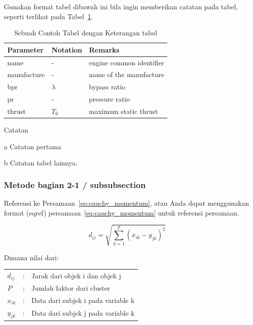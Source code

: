 \documentclass[
 manuscript=article,  %
  layout=publish, 
  year=2024, 
  month= Februari, %
  volume=8,
  number=1 
]{JIKO}
\begin{document}
Gunakan format tabel dibawah ini bila ingin memberikan catatan pada tabel, seperti terlihat pada Tabel~\ref{contohtabel}.
\begin{table}[hbt!]
	\begin{threeparttable}
		\caption{Sebuah Contoh Tabel dengan Keterangan tabel}
		\label{contohtabel}
		 \begin{tabular}{lll}
			\toprule
			\textbf{Parameter} & \textbf{Notation} & \textbf{Remarks} \\
			\midrule
			name & - & engine common identifier \\
			manufacture & - & name of the manufacture  \\
			bpr & $\lambda$ & bypass ratio \\
			pr & - & pressure ratio \\
			thrust & $T_0$ & maximum static thrust\\
			\bottomrule
		\end{tabular}

		\begin{tablenotes}[hang]
			\item[]Catatan
			\item[a]Catatan pertama
			\item[b]Catatan tabel lainnya.
		\end{tablenotes}
	\end{threeparttable}
\end{table}

\subsubsection{Metode bagian 2-1 / subsubsection }

Referensi ke Persamaan~\ref{eq:cauchy_momentum}, atau Anda dapat menggunakan format (eqref) persamaan~\eqref{eq:cauchy_momentum} untuk referensi persamaan.

\begin{equation}\label{eq:cauchy_momentum}
	d_{ij} = \sqrt{{\sum_{k=1}^{p}}(x_{ik}-y_{jk})^2}
\end{equation}

Dimana nilai dari:\\
\begin{tabular}{lcl}
	$d_{ij}$ &:& Jarak dari objek i dan objek j\\
	$P$		&:& Jumlah faktor dari cluster\\
	$x_{ik}$ 		&:& Data dari subjek i pada variable k\\
	$y_{jk}$ 		&:& Data dari subjek j pada variable k\\
\end{tabular}
\end{document}
